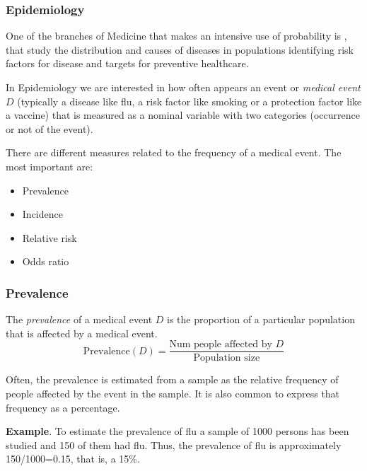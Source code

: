 \begin{frame}
\frametitle{Epidemiology}
One of the branches of Medicine that makes an intensive use of probability is , that study the distribution and causes of diseases in populations identifying risk factors for disease and targets for preventive healthcare.

In Epidemiology we are interested in how often appears an event or \emph{medical event} $D$ (typically a disease like flu, a risk factor like smoking or a protection factor like a vaccine) that is measured as a nominal variable with two categories (occurrence or not of the event). 

There are different measures related to the frequency of a medical event.
The most important are:
\begin{itemize}
  \item Prevalence
  \item Incidence
  \item Relative risk
  \item Odds ratio
\end{itemize}
\end{frame}


\begin{frame}
\frametitle{Prevalence}
\begin{definition}[Prevalence]
The \emph{prevalence} of a medical event $D$ is the proportion of a particular population that is affected by a medical event.
\[
  \mbox{Prevalence}(D) = \frac{\mbox{Num people affected by $D$}}{\mbox{Population size}}
\]
\end{definition}

Often, the prevalence is estimated from a sample as the relative frequency of people affected by the event in the sample.
It is also common to express that frequency as a percentage. 

\textbf{Example}. To estimate the prevalence of flu a sample of 1000 persons has been studied and 150 of them had flu. 
Thus, the prevalence of flu is approximately 150/1000=0.15, that is, a 15\%. 

\end{frame}
  

